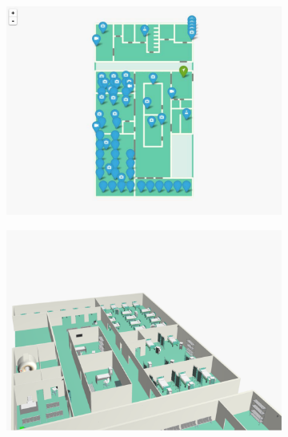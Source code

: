 \documentclass[]{egpubl}
\begin{document}
\begin{figure}[htbp] %
   \centering
\hspace{-3mm}   
   \begin{subfigure}[b]{0.175\textwidth}
   \includegraphics[width=\textwidth]{images/emergency/13}
   \caption{}
   \end{subfigure}
\hspace{-3mm}   
   \begin{subfigure}[b]{0.175\textwidth}
   \includegraphics[width=\textwidth]{images/emergency/14}
   \caption{}
   \end{subfigure}
\hspace{-3mm}   
   \begin{subfigure}[b]{0.175\textwidth}

\end{subfigure}
\end{figure}
\end{document}
